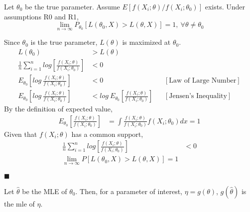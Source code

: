 \documentclass[9pt]{article}
\renewcommand{\qed}{\hfill$\blacksquare$}
\renewenvironment{proof}{\begin{addmargin}[1em]{0em}\begin{newproof}}{\end{newproof}\end{addmargin}\qed}
\newenvironment{theorem}[2][Theorem]{\begin{trivlist}
\item[\hskip \labelsep {\bfseries #1}\hskip \labelsep {\bfseries #2}]}{\end{trivlist}}
\begin{document}
\begin{theorem}{Probability of Maximum Likelihood}

 Let $\theta_0$ be the true parameter. Assume $E[f(X_i;\theta)/f(X_i;\theta_0)]$ exists. Under assumptions R0 and R1,
$$
    \lim_{n\to \infty} P_{\theta_0}[L(\theta_0, X) > L(\theta, X)] = 1,\ \forall \theta \not = \theta_0
$$
\end{theorem} 

\begin{proof}
Since $\theta_0$ is the true parameter,  $L(\theta)$ is maximized at $\theta_0$.
        \begin{align*}
        L(\theta_0) &> L(\theta)\\
        \frac{1}{n}\sum^n_{i=1}log \left[ \frac{f(X_i;\theta)}{f(X_i;\theta_0)}\right] &< 0\\
        E_{\theta_0}\left[log\ \frac{f(X_i;\theta)}{f(X_i;\theta_0)}\right] &< 0 &&[\text{Law of Large Number}]\\
        E_{\theta_0}\left[log\ \frac{f(X_i;\theta)}{f(X_i;\theta_0)}\right] &< log\ E_{\theta_0}\left[ \frac{f(X_i;\theta)}{f(X_i;\theta_0)}\right] && [\text{Jensen's Inequality}]
    \end{align*}
By the definition of expected value,
\begin{align*}
    E_{\theta_0}\left[\frac{f(X_i;\theta)}{f(X_i;\theta_0)}\right] &= \int \frac{f(X_i;\theta)}{f(X_i;\theta_0)} f(X_i;\theta_0)dx = 1
\end{align*}
Given that $f(X_i;\theta)$ has a common support,
\begin{align*}
    \frac{1}{n}\sum^n_{i=1}log \left[ \frac{f(X_i;\theta)}{f(X_i;\theta_0)}\right] &< 0\\
    \lim_{n\to \infty} P[L(\theta_0, X) > L(\theta, X)] =1
\end{align*}
\end{proof}

\begin{theorem}{MLE of a Function of Parameter}
    Let $\hat \theta$ be the MLE of $\theta_0$. Then, for a parameter of interest, $\eta = g(\theta)$,  $g(\hat\theta)$ is the mle of $\eta$.
\end{theorem}
\end{document}
